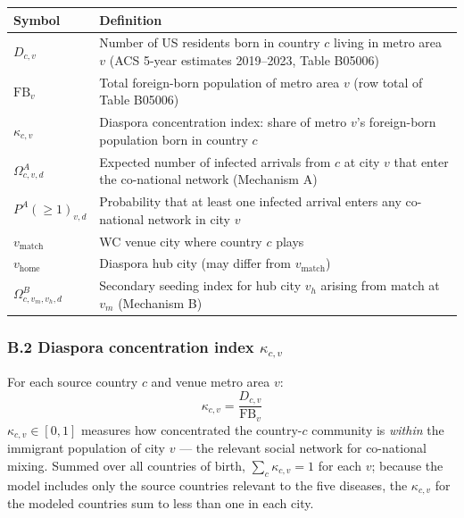 \documentclass[12pt, a4paper]{article}
\begin{document}
\begin{center}
\small
\begin{tabular}{p{2.8cm} p{9.5cm}}
\toprule
\textbf{Symbol} & \textbf{Definition} \\
\midrule
$D_{c,v}$            & Number of US residents born in country $c$
                       living in metro area $v$
                       (ACS 5-year estimates 2019--2023, Table B05006) \\
$\mathrm{FB}_{v}$    & Total foreign-born population of metro area $v$
                       (row total of Table B05006) \\
$\kappa_{c,v}$       & Diaspora concentration index: share of metro
                       $v$'s foreign-born population born in country $c$ \\
$\Omega^A_{c,v,d}$   & Expected number of infected arrivals from $c$
                       at city $v$ that enter the co-national network
                       (Mechanism A) \\
$P^A(\geq 1)_{v,d}$  & Probability that at least one infected arrival
                       enters any co-national network in city $v$ \\
$v_{\text{match}}$   & WC venue city where country $c$ plays \\
$v_{\text{home}}$    & Diaspora hub city (may differ from
                       $v_{\text{match}}$) \\
$\Omega^B_{c,v_m,v_h,d}$ & Secondary seeding index for hub city
                       $v_h$ arising from match at $v_m$ (Mechanism B) \\
\bottomrule
\end{tabular}
\end{center}

\subsubsection*{B.2 Diaspora concentration index $\kappa_{c,v}$}

For each source country $c$ and venue metro area $v$:
\[
  \kappa_{c,v} = \frac{D_{c,v}}{\mathrm{FB}_{v}}
\]
$\kappa_{c,v} \in [0,1]$ measures how concentrated the country-$c$
community is \emph{within} the immigrant population of city $v$ ---
the relevant social network for co-national mixing. Summed over all countries of birth, $\sum_c \kappa_{c,v} = 1$ for each $v$; because the model includes only the source countries relevant to the five diseases, the $\kappa_{c,v}$ for the modeled countries sum to less than one in each city.
\end{document}
